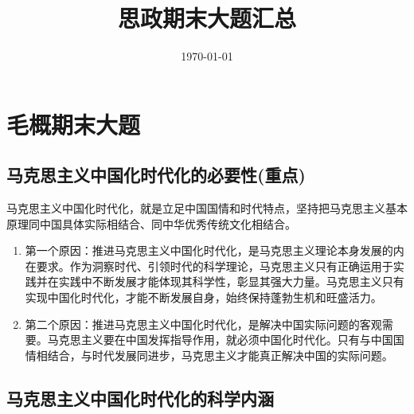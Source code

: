 \documentclass[12pt, a4paper, oneside]{ctexbook}
\title{{\Huge{\textbf{思政期末大题汇总}}}}
\author{}
\date{\today}
\begin{document}
\maketitle

\setcounter{page}{1}




{}
\setcounter{page}{1}
\tableofcontents
\newpage
\setcounter{page}{1}

\chapter{毛概期末大题}

\section{马克思主义中国化时代化的必要性(重点)}

马克思主义中国化时代化，就是立足中国国情和时代特点，坚持把马克思主义基本原理同中国具体实际相结合、同中华优秀传统文化相结合。

\begin{enumerate}
\item 第一个原因：推进马克思主义中国化时代化，是马克思主义理论本身发展的内在要求。作为洞察时代、引领时代的科学理论，马克思主义只有正确运用于实践并在实践中不断发展才能体现其科学性，彰显其强大力量。马克思主义只有实现中国化时代化，才能不断发展自身，始终保持蓬勃生机和旺盛活力。
\item 第二个原因：推进马克思主义中国化时代化，是解决中国实际问题的客观需要。马克思主义要在中国发挥指导作用，就必须中国化时代化。只有与中国国情相结合，与时代发展同进步，马克思主义才能真正解决中国的实际问题。
\end{enumerate}

\section{马克思主义中国化时代化的科学内涵}
\end{document}
